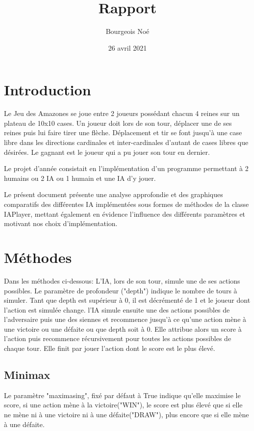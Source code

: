 \documentclass[utf8]{article}
\title{Rapport}
\author{Bourgeois Noé}
\date{26 avril 2021}
\begin{document}
\maketitle
\tableofcontents

\newpage


\section{Introduction}

Le Jeu des Amazones se joue entre 2 joueurs possédant chacun 4 reines sur un plateau de 10x10 cases.
Un joueur doit lors de son tour, déplacer une de ses reines puis lui faire tirer une flèche.
Déplacement et tir se font jusqu'à une case libre dans les directions cardinales et inter-cardinales d'autant de cases libres que désirées.
Le gagnant est le joueur qui a pu jouer son tour en dernier.

Le projet d’année consistait en l'implémentation d'un programme permettant à 2 humains ou 2 IA ou 1 humain et une IA d'y jouer.

Le présent document présente une analyse approfondie et des graphiques comparatifs des différentes IA implémentées sous formes de méthodes de la classe IAPlayer,
mettant également en évidence l’influence des différents paramètres et motivant nos choix d’implémentation.


\section{Méthodes}
Dans les méthodes ci-dessous:
 L'IA, lors de son tour, simule une de ses actions possibles.
 Le paramètre de profondeur ("depth") indique le nombre de tours à simuler.
 Tant que depth est supérieur à 0, il est décrémenté de 1 et le joueur dont l'action est simulée change. l'IA simule ensuite une des actions possibles de l'adversaire puis une des siennes et recommence jusqu'à ce qu'une action mène à une victoire ou une défaite ou que depth soit à 0.
 Elle attribue alors un score à l'action puis recommence récursivement pour toutes les actions possibles de chaque tour.
 Elle finit par jouer l'action dont le score est le plus élevé.

\subsection{Minimax}
Le paramètre "maximasing", fixé par défaut à True indique qu'elle maximise le score, si une action mène à la victoire("WIN"), le score est plus élevé que si elle ne mène ni à une victoire ni à une défaite("DRAW"), plus encore que si elle mène à une défaite.
\end{document}
